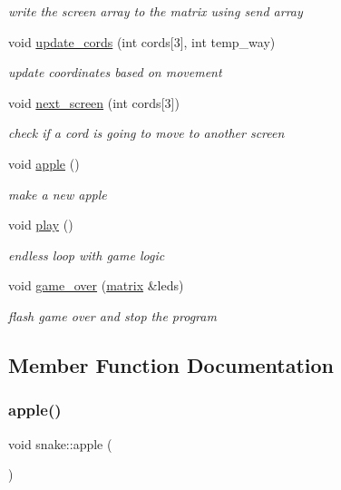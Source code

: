 \begin{DoxyCompactItemize}
\begin{DoxyCompactList}\small\item\em write the screen array to the matrix using send array \end{DoxyCompactList}\item 
void \hyperlink{classsnake_a1f937902d3c8ebca239718ffedae8a10}{update\+\_\+cords} (int cords\mbox{[}3\mbox{]}, int temp\+\_\+way)
\begin{DoxyCompactList}\small\item\em update coordinates based on movement \end{DoxyCompactList}\item 
void \hyperlink{classsnake_abfcdd38b48ecc4e5d14d1f0503bc3c5c}{next\+\_\+screen} (int cords\mbox{[}3\mbox{]})
\begin{DoxyCompactList}\small\item\em check if a cord is going to move to another screen \end{DoxyCompactList}\item 
void \hyperlink{classsnake_adc7f22b197d4003dc39eb6d02504a789}{apple} ()
\begin{DoxyCompactList}\small\item\em make a new apple \end{DoxyCompactList}\item 
void \hyperlink{classsnake_aa0125208393f6d3a7b25ea2a2afcf253}{play} ()
\begin{DoxyCompactList}\small\item\em endless loop with game logic \end{DoxyCompactList}\item 
void \hyperlink{classsnake_ab0a41a85507415018d8f6d6c9e6fb42c}{game\+\_\+over} (\hyperlink{classmatrix}{matrix} \&leds)
\begin{DoxyCompactList}\small\item\em flash game over and stop the program \end{DoxyCompactList}\end{DoxyCompactItemize}


\subsection{Member Function Documentation}
\mbox{\label{classsnake_adc7f22b197d4003dc39eb6d02504a789}} 
\subsubsection{\texorpdfstring{apple()}{apple()}}
{\footnotesize\ttfamily void snake\+::apple (\begin{DoxyParamCaption}{ }\end{DoxyParamCaption})}



